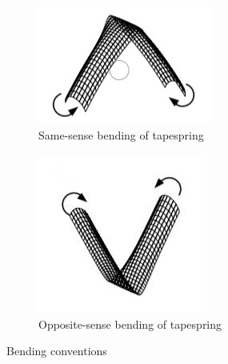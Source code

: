 \begin{figure}[!hbt]
     \centering
     \begin{subfigure}[b]{0.4\textwidth}
         \centering
         \includegraphics[width=\textwidth]{images/samesense.JPG}
         \caption{Same-sense bending of tapespring}
         \label{fig:same}
     \end{subfigure}
     \hfill
     \begin{subfigure}[b]{0.4\textwidth}
         \centering
         \includegraphics[width=\textwidth]{images/oppsense.JPG}
         \caption{Opposite-sense bending of tapespring}
         \label{fig:opp}
     \end{subfigure}
     \caption{Bending conventions}
     \end{figure}

